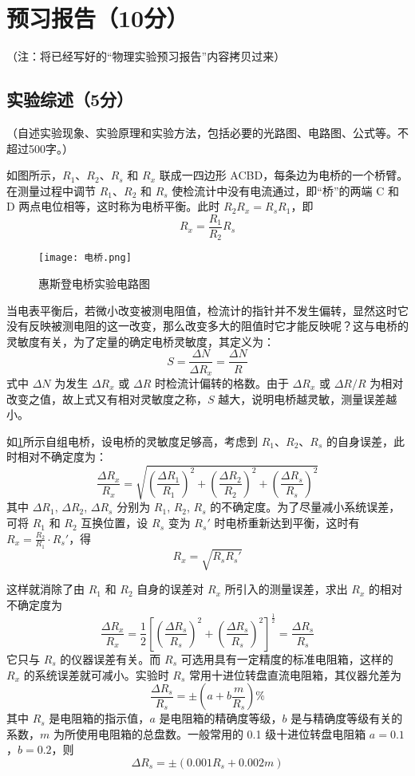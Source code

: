 \documentclass{../template/Report}%
\begin{document}
\maketitle

\section{预习报告（10分）}
（注：将已经写好的“物理实验预习报告”内容拷贝过来）

\subsection{实验综述（5分）}
（自述实验现象、实验原理和实验方法，包括必要的光路图、电路图、公式等。不超过500字。）

如图所示，$R_1$、$R_2$、$R_s$ 和 $R_x$ 联成一四边形 ACBD，每条边为电桥的一个桥臂。在测量过程中调节 $R_1$、$R_2$ 和 $R_s$ 使检流计中没有电流通过，即“桥”的两端 C 和 D 两点电位相等，这时称为电桥平衡。此时 $R_2 R_x = R_s R_1$，即
\[
    R_x = \frac{R_1}{R_2} R_s
\]
\begin{figure}[H]
    \centering
    \texttt{[image: 电桥.png]}
    \caption{惠斯登电桥实验电路图}
    \label{fig:电桥}
\end{figure}
当电表平衡后，若微小改变被测电阻值，检流计的指针并不发生偏转，显然这时它没有反映被测电阻的这一改变，那么改变多大的阻值时它才能反映呢？这与电桥的灵敏度有关，为了定量的确定电桥灵敏度，其定义为：
\[
    S = \frac{\Delta N}{\Delta R_x} = \frac{\Delta N}{R}
\]
式中 $\Delta N$ 为发生 $\Delta R_x$ 或 $\Delta R$ 时检流计偏转的格数。由于 $\Delta R_x$ 或 $\Delta R/R$ 为相对改变之值，故上式又有相对灵敏度之称，$S$ 越大，说明电桥越灵敏，测量误差越小。

如\cref{fig:电桥}所示自组电桥，设电桥的灵敏度足够高，考虑到 $R_1$、$R_2$、$R_s$ 的自身误差，此时相对不确定度为：
\[
    \frac{\Delta R_x}{R_x} = \sqrt{ \left(\frac{\Delta R_1}{R_1}\right)^2 + \left(\frac{\Delta R_2}{R_2}\right)^2 + \left(\frac{\Delta R_s}{R_s}\right)^2 }
\]
其中 $\Delta R_1$, $\Delta R_2$, $\Delta R_s$ 分别为 $R_1$, $R_2$, $R_s$ 的不确定度。为了尽量减小系统误差，可将 $R_1$ 和 $R_2$ 互换位置，设 $R_s$ 变为 $R_s'$ 时电桥重新达到平衡，这时有 $R_x = \frac{R_2}{R_1} \cdot R_s'$，得
\[
    R_x = \sqrt{R_s R_s'}
\]

这样就消除了由 $R_1$ 和 $R_2$ 自身的误差对 $R_x$ 所引入的测量误差，求出 $R_x$ 的相对不确定度为
\[
    \frac{\Delta R_x}{R_x} = \frac{1}{2}\left[\left(\frac{\Delta R_s}{R_s}\right)^2+\left(\frac{\Delta R_s}{R_s}\right)^2\right]^{\frac{1}{2}} = \frac{\Delta R_s}{R_s}
\]
它只与 $R_s$ 的仪器误差有关。而 $R_s$ 可选用具有一定精度的标准电阻箱，这样的 $R_x$ 的系统误差就可减小。实验时 $R_s$ 常用十进位转盘直流电阻箱，其仪器允差为
\[
    \frac{\Delta R_s}{R_s} = \pm \left( a + b \frac{m}{R_s} \right) \%
\]
其中 $R_s$ 是电阻箱的指示值，$a$ 是电阻箱的精确度等级，$b$ 是与精确度等级有关的系数，$m$ 为所使用电阻箱的总盘数。一般常用的 0.1 级十进位转盘电阻箱 $a=0.1$，$b=0.2$，则
\[
    \Delta R_s = \pm (0.001 R_s + 0.002 m)
\]
\end{document}
